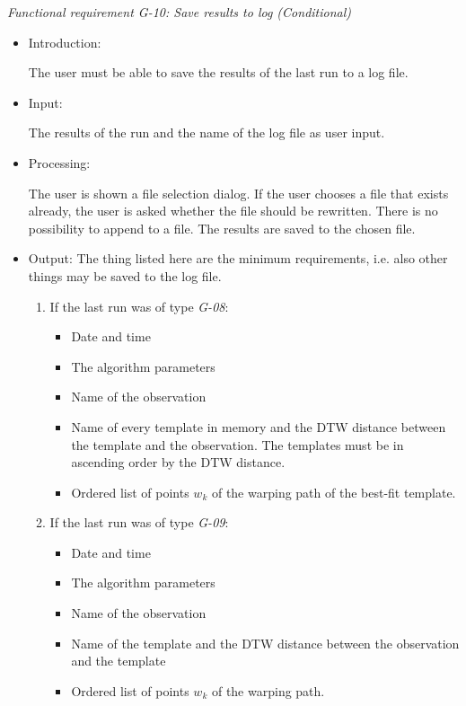 \documentclass[a4paper,11pt]{article}
\begin{document}
\noindent \emph{Functional requirement G-10: Save results to log (Conditional)}
\begin{itemize}
\item Introduction:

The user must be able to save the results of the last run to a log file.  
\item Input:

The results of the run and the name of the log file as user input.
\item Processing:

The user is shown a file selection dialog. If the user chooses a file that exists already, the user is asked whether
the file should be rewritten. There is no possibility to append to a file. The results are saved to the chosen file.
\item Output:
The thing listed here are the minimum requirements, i.e. also other things may be saved to the log file. 
\begin{enumerate}
\item If the last run was of type \emph{G-08}:
\begin{itemize}
\item Date and time
\item The algorithm parameters
\item Name of the observation
\item Name of every template in memory and the DTW distance between the template and the observation. The templates must
be in ascending order by the DTW distance.
\item Ordered list of points $w_k$ of the warping path of the best-fit template.
\end{itemize}

\item If the last run was of type \emph{G-09}:
\begin{itemize}
\item Date and time
\item The algorithm parameters
\item Name of the observation
\item Name of the template and the DTW distance between the observation and the template
\item Ordered list of points $w_k$ of the warping path.
\end{itemize}
\end{enumerate}

\end{itemize}
\end{document}
